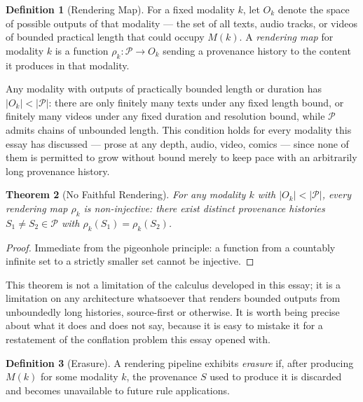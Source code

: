 \documentclass[11pt]{article}
\newtheorem{theorem}{Theorem}[section]
\theoremstyle{definition}
\newtheorem{definition}[theorem]{Definition}
\begin{document}
\begin{definition}[Rendering Map]
\label{def:rendering-map}
For a fixed modality $k$, let $O_k$ denote the space of possible outputs of that modality --- the set of all texts, audio tracks, or videos of bounded practical length that could occupy $M(k)$. A \emph{rendering map} for modality $k$ is a function $\rho_k : \mathcal{P} \to O_k$ sending a provenance history to the content it produces in that modality.
\end{definition}

Any modality with outputs of practically bounded length or duration has $|O_k| < |\mathcal{P}|$: there are only finitely many texts under any fixed length bound, or finitely many videos under any fixed duration and resolution bound, while $\mathcal{P}$ admits chains of unbounded length. This condition holds for every modality this essay has discussed --- prose at any depth, audio, video, comics --- since none of them is permitted to grow without bound merely to keep pace with an arbitrarily long provenance history.

\begin{theorem}[No Faithful Rendering]
\label{thm:no-faithful-rendering}
For any modality $k$ with $|O_k| < |\mathcal{P}|$, every rendering map $\rho_k$ is non-injective: there exist distinct provenance histories $S_1 \neq S_2 \in \mathcal{P}$ with $\rho_k(S_1) = \rho_k(S_2)$.
\end{theorem}

\begin{proof}
Immediate from the pigeonhole principle: a function from a countably infinite set to a strictly smaller set cannot be injective.
\end{proof}

This theorem is not a limitation of the calculus developed in this essay; it is a limitation on any architecture whatsoever that renders bounded outputs from unboundedly long histories, source-first or otherwise. It is worth being precise about what it does and does not say, because it is easy to mistake it for a restatement of the conflation problem this essay opened with.

\begin{definition}[Erasure]
\label{def:erasure}
A rendering pipeline exhibits \emph{erasure} if, after producing $M(k)$ for some modality $k$, the provenance $S$ used to produce it is discarded and becomes unavailable to future rule applications.
\end{definition}
\end{document}
